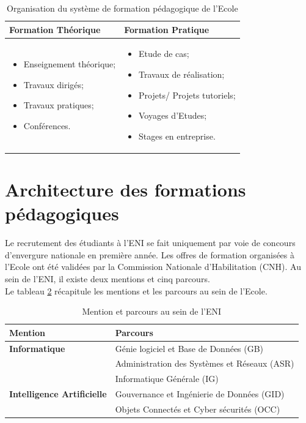 \documentclass[12pt]{report}
\begin{document}
				\begin{longtable}{|p{7cm}|p{7cm}|}
					\caption{Organisation du système de formation pédagogique de l’Ecole}
					\label{tab:formationPedagogiqueENI}\\
					\hline
					    \textbf{Formation Théorique} & \textbf{Formation Pratique} \\
					\hline
					\endfirsthead
					\endhead				  
					    \begin{itemize}
						\item Enseignement théorique;
						\item Travaux dirigés;
						\item Travaux pratiques;
						\item Conférences.
					    \end{itemize}
					 &  
					\begin{itemize}
						\item Etude de cas;
						\item Travaux de réalisation;
						\item Projets/ Projets tutoriels;
						\item Voyages d’Etudes;
						\item Stages en entreprise.
					\end{itemize}
					\\
					    \hline
				\end{longtable}
				\FloatBarrier

				\section{Architecture des formations pédagogiques}

				\hspace{15pt} Le recrutement des étudiants à l’ENI se fait uniquement par voie de concours d’envergure nationale en première année. Les offres de formation organisées à l’Ecole ont été validées par la Commission Nationale d’Habilitation (CNH). Au sein de l’ENI, il existe deux mentions et cinq parcours.\\

				Le tableau \ref{tab:mentionsEtParcoursENI} récapitule les mentions et les parcours au sein de l’Ecole.

				\begin{longtable}{|p{7cm}|p{7cm}|}
					\caption{Mention et parcours au sein de l’ENI}
   					\label{tab:mentionsEtParcoursENI}\\
					\hline 
					\textbf{Mention} & \textbf{Parcours} \\
					\hline
					\endfirsthead
					\endhead 
					\textbf{Informatique} & Génie logiciel et Base de Données (GB) \\ \cline{2-2} & Administration des Systèmes et Réseaux (ASR) \\ \cline{2-2} & Informatique Générale (IG) \\ 
					\hline 
					\textbf{Intelligence Artificielle} & Gouvernance et Ingénierie de Données (GID) \\ \cline{2-2} & Objets Connectés et Cyber sécurités (OCC) \\
					\hline 
				\end{longtable}
				\FloatBarrier
\end{document}
